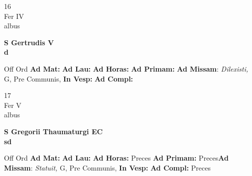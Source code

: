 \documentclass[10pt, openany]{book}
\begin{document}
    \begin{center}
        \begin{minipage}{3.5in}
            \vspace{2em}
            \begin{minipage}{0.5in}
                {\Huge 16} \\
                {\normalsize Fer IV} \\
                {\normalsize albus}
            \end{minipage}
            \begin{minipage}{3.0in}
                \textbf{ \large S Gertrudis V \\
                \textnormal{\normalsize d}} \\ 
            \end{minipage}
            \begin{justify}Off Ord
                \textbf{Ad Mat: }
                \textbf{Ad Lau: }
                \textbf{Ad Horas: }
                \textbf{Ad Primam: }\textbf{Ad Missam}: \textit{Dilexisti,} G, Pre Communis,  
                \textbf{In Vesp: }
                \textbf{Ad Compl: }
            \end{justify}
        \end{minipage}
    \end{center}

    \begin{center}
        \begin{minipage}{3.5in}
            \vspace{2em}
            \begin{minipage}{0.5in}
                {\Huge 17} \\
                {\normalsize Fer V} \\
                {\normalsize albus}
            \end{minipage}
            \begin{minipage}{3.0in}
                \textbf{ \large S Gregorii Thaumaturgi EC \\
                \textnormal{\normalsize sd}} \\ 
            \end{minipage}
            \begin{justify}Off Ord
                \textbf{Ad Mat: }
                \textbf{Ad Lau: }
                \textbf{Ad Horas: }Preces
                \textbf{Ad Primam: }Preces\textbf{Ad Missam}: \textit{Statuit,} G, Pre Communis,  
                \textbf{In Vesp: }
                \textbf{Ad Compl: }Preces
            \end{justify}
        \end{minipage}
    \end{center}
\end{document}
